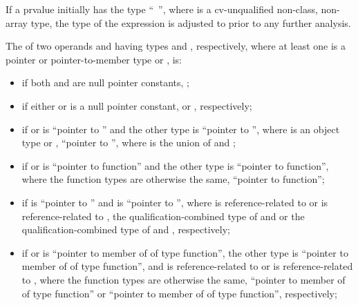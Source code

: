 \pnum
If a prvalue initially has the type ``\cv{}~'', where
 is a cv-unqualified non-class, non-array type, the type of
the expression is adjusted to  prior to any further analysis.

\pnum
{}%
The  of
two operands  and
 having types  and , respectively, where at least one is a
pointer or pointer-to-member type or
, is:
\begin{itemize}
\item
if both  and  are null pointer constants,
;

\item
if either  or  is a null pointer constant,  or ,
respectively;

\item
if  or  is ``pointer to  '' and the
other type is ``pointer to  '',
where  is an object type or ,
``pointer to  '',
where  is the union of  and ;

\item
if  or  is ``pointer to  function'' and the
other type is ``pointer to function'', where the function types are otherwise the same,
``pointer to function'';

\item
if  is ``pointer to  '' and  is ``pointer to
 '', where  is reference-related to  or  is
reference-related to ,
the qualification-combined type
of  and  or the qualification-combined type of  and ,
respectively;

\item
if  or  is
``pointer to member of  of type function'',
the other type is
``pointer to member of  of type  function'', and
 is reference-related to  or
 is reference-related to ,
where the function types are otherwise the same,
``pointer to member of  of type function'' or
``pointer to member of  of type function'', respectively;


\end{itemize}
